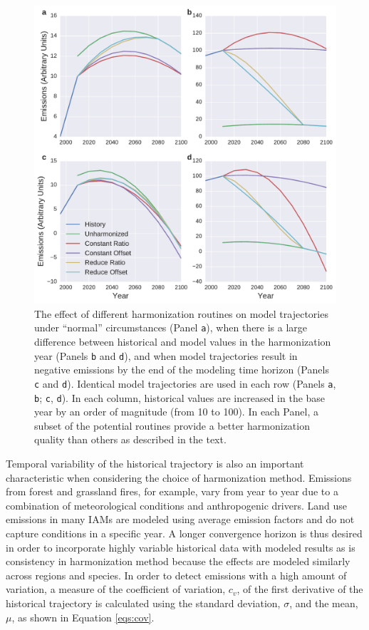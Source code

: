 \documentclass[review]{elsarticle}
\newcommand{\code}[1]{\lstinline[basicstyle=\ttfamily\color{black}]|#1|}
\begin{document}
\begin{figure}
  \begin{center}
    \includegraphics[width=\textwidth]{cases.pdf}
    \caption[]{
      \label{fig:cases}
      The effect of different harmonization routines on model trajectories under
      ``normal'' circumstances (Panel \code{a}), when there is a large
      difference between historical and model values in the harmonization year
      (Panels \code{b} and \code{d}), and when model trajectories result in
      negative emissions by the end of the modeling time horizon (Panels
      \code{c} and \code{d}). Identical model trajectories are used in each row
      (Panels \code{a}, \code{b}; \code{c}, \code{d}). In each column,
      historical values are increased in the base year by an order of magnitude
      (from 10 to 100). In each Panel, a subset of the potential routines
      provide a better harmonization quality than others as described in the
      text.
    }
  \end{center}
\end{figure}

Temporal variability of the historical trajectory is also an important
characteristic when considering the choice of harmonization method.  Emissions
from forest and grassland fires, for example, vary from year to year due to a
combination of meteorological conditions and anthropogenic drivers. Land use
emissions in many IAMs are modeled using average emission factors and do not
capture conditions in a specific year. A longer convergence horizon is thus
desired in order to incorporate highly variable historical data with modeled
results as is consistency in harmonization method because the effects are
modeled similarly across regions and species. In order to detect emissions with
a high amount of variation, a measure of the coefficient of variation, $c_v$, of
the first derivative of the historical trajectory is calculated using the
standard deviation, $\sigma$, and the mean, $\mu$, as shown in Equation
\ref{eqs:cov}.
\end{document}
